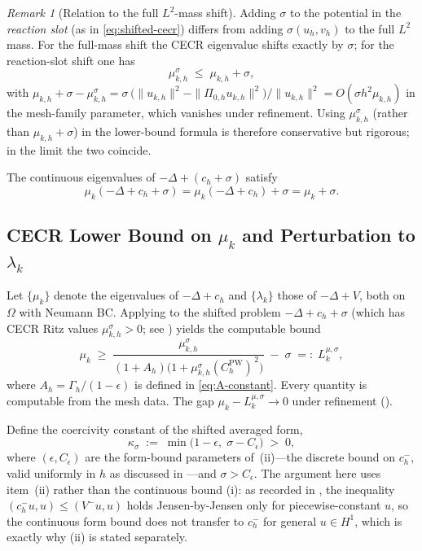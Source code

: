 \documentclass[11pt]{article}
\theoremstyle{plain}
\theoremstyle{definition}
\theoremstyle{remark}
\newtheorem{remark}{Remark}
\begin{document}
\begin{remark}[Relation to the full $L^2$-mass shift]
\label{rmk:shift-comparison}
Adding $\sigma$ to the potential in the \emph{reaction slot}
(as in \eqref{eq:shifted-cecr}) differs from adding
$\sigma(u_h,v_h)$ to the full $L^2$ mass.  For the full-mass
shift the CECR eigenvalue shifts exactly by $\sigma$; for the
reaction-slot shift one has
\[
  \mu_{k,h}^\sigma \;\le\; \mu_{k,h}+\sigma,
\]
with $\mu_{k,h}+\sigma - \mu_{k,h}^\sigma
=\sigma\,\bigl(\|u_{k,h}\|^2-\|\Pi_{0,h}u_{k,h}\|^2\bigr)/
\|u_{k,h}\|^2 = O(\sigma h^2\mu_{k,h})$ in the mesh-family parameter,
which vanishes under refinement.
Using $\mu_{k,h}^\sigma$ (rather than $\mu_{k,h}+\sigma$) in the
lower-bound formula is therefore conservative but rigorous; in
the limit the two coincide.
\end{remark}

The continuous eigenvalues of $-\Delta+(c_h+\sigma)$ satisfy
\begin{equation}
\label{eq:sigma-shift-continuous}
  \mu_k(-\Delta+c_h+\sigma) = \mu_k(-\Delta+c_h) + \sigma
  = \mu_k + \sigma.
\end{equation}

\subsection{CECR Lower Bound on \texorpdfstring{$\mu_k$}{mu\_k} and Perturbation to \texorpdfstring{$\lambda_k$}{lambda\_k}}
\label{subsec:perturbation}

Let $\{\mu_k\}$ denote the eigenvalues of $-\Delta+c_h$ and
$\{\lambda_k\}$ those of $-\Delta+V$, both on $\Omega$ with Neumann BC.
Applying  to the shifted problem
$-\Delta+c_h+\sigma$ (which has CECR Ritz values
$\mu_{k,h}^\sigma>0$; see ) yields the
computable bound
\begin{equation}
\label{eq:convergent-LB-sigma}
  \mu_k
  \;\ge\;
  \frac{\mu_{k,h}^\sigma}
       {(1+A_h)\bigl(1+\mu_{k,h}^\sigma(C_h^{\mathrm{PW}})^{\,2}\bigr)}
  \;-\;\sigma
  \;=:\; L_k^{\mu,\sigma},
\end{equation}
where $A_h=\Gamma_h/(1{-}\epsilon)$ is defined in
\eqref{eq:A-constant}. Every quantity is computable from the mesh
data. The gap $\mu_k-L_k^{\mu,\sigma}\to 0$ under refinement
().

Define the coercivity constant of the shifted averaged form,
\begin{equation}
\label{eq:kappa-sigma}
  \kappa_\sigma
  \;:=\; \min\bigl(1-\epsilon,\;\sigma-C_\epsilon\bigr) \;>\; 0,
\end{equation}
where $(\epsilon,C_\epsilon)$ are the form-bound parameters of
\,(ii)---the discrete bound on $c_h^-$, valid
uniformly in $h$ as discussed in ---and
$\sigma>C_\epsilon$. The argument here uses item~(ii) rather than the
continuous bound (i): as recorded in , the
inequality $(c_h^-u,u)\le(V^-u,u)$ holds Jensen-by-Jensen only for
piecewise-constant $u$, so the continuous form bound does not transfer
to $c_h^-$ for general $u\in H^1$, which is exactly why (ii) is stated
separately.
\end{document}
